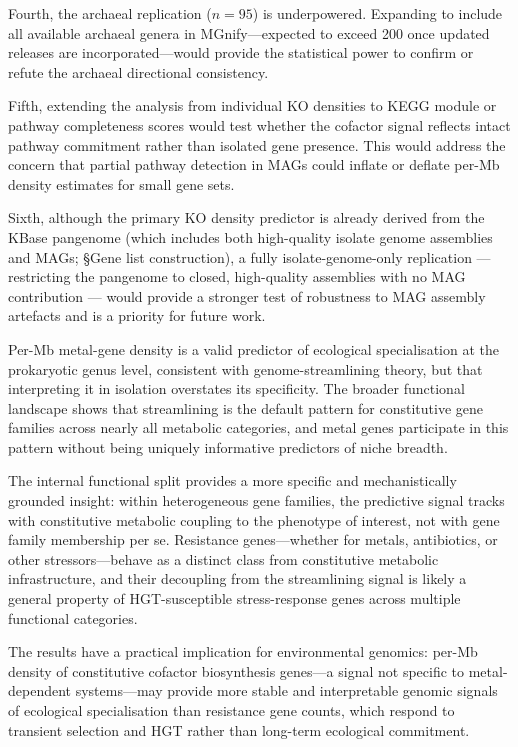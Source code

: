\documentclass[times]{zHenriquesLab-StyleBioRxiv}
\begin{document}
Fourth, the archaeal replication ($n = 95$) is underpowered. Expanding to
include all available archaeal genera in MGnify---expected to exceed 200 once
updated releases are incorporated---would provide the statistical power to confirm
or refute the archaeal directional consistency.

Fifth, extending the analysis from individual KO densities to KEGG module or
pathway completeness scores would test whether the cofactor signal reflects
intact pathway commitment rather than isolated gene presence. This would address
the concern that partial pathway detection in MAGs could inflate or deflate
per-Mb density estimates for small gene sets.

Sixth, although the primary KO density predictor is already derived from the
KBase pangenome (which includes both high-quality isolate genome assemblies and
MAGs; \S{}Gene list construction), a fully isolate-genome-only replication ---
restricting the pangenome to closed, high-quality assemblies with no MAG
contribution --- would provide a stronger test of robustness to MAG assembly
artefacts and is a priority for future work.



Per-Mb metal-gene density is a valid predictor of
ecological specialisation at the prokaryotic genus level, consistent with
genome-streamlining theory, but that interpreting it in isolation overstates its
specificity. The broader functional landscape shows that streamlining is the
default pattern for constitutive gene families across nearly all metabolic
categories, and metal genes participate in this pattern without being uniquely
informative predictors of niche breadth.

The internal functional split provides a more specific and mechanistically
grounded insight: within heterogeneous gene families, the predictive signal
tracks with constitutive metabolic coupling to the phenotype of interest, not
with gene family membership per se. Resistance genes---whether for metals,
antibiotics, or other stressors---behave as a distinct class from constitutive
metabolic infrastructure, and their decoupling from the streamlining signal is
likely a general property of HGT-susceptible stress-response genes across
multiple functional categories.

The results have a practical implication for environmental genomics: per-Mb
density of constitutive cofactor biosynthesis genes---a signal not specific to
metal-dependent systems---may provide more stable and interpretable genomic
signals of ecological specialisation than resistance gene counts, which respond
to transient selection and HGT rather than long-term ecological commitment.
\end{document}

